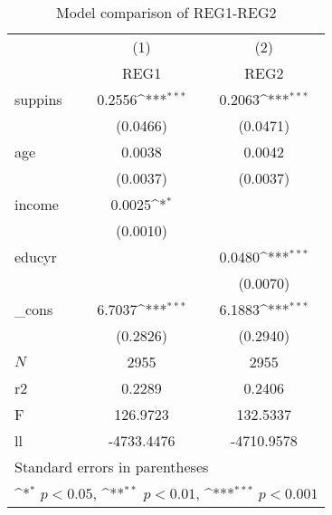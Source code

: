 \begin{table}[htbp]\centering
\def\sym#1{\ifmmode^{#1}\else\(^{#1}\)\fi}
\caption{Model comparison of REG1-REG2}
\begin{tabular}{l*{2}{c}}
\hline\hline
            &\multicolumn{1}{c}{(1)}&\multicolumn{1}{c}{(2)}\\
            &\multicolumn{1}{c}{REG1}&\multicolumn{1}{c}{REG2}\\
\hline
suppins     &      0.2556\sym{***}&      0.2063\sym{***}\\
            &    (0.0466)         &    (0.0471)         \\
[1em]
age         &      0.0038         &      0.0042         \\
            &    (0.0037)         &    (0.0037)         \\
[1em]
income      &      0.0025\sym{*}  &                     \\
            &    (0.0010)         &                     \\
[1em]
educyr      &                     &      0.0480\sym{***}\\
            &                     &    (0.0070)         \\
[1em]
\_cons      &      6.7037\sym{***}&      6.1883\sym{***}\\
            &    (0.2826)         &    (0.2940)         \\
\hline
\(N\)       &        2955         &        2955         \\
r2          &      0.2289         &      0.2406         \\
F           &    126.9723         &    132.5337         \\
ll          &  -4733.4476         &  -4710.9578         \\
\hline\hline
\multicolumn{3}{l}{\footnotesize Standard errors in parentheses}\\
\multicolumn{3}{l}{\footnotesize \sym{*} \(p<0.05\), \sym{**} \(p<0.01\), \sym{***} \(p<0.001\)}\\
\end{tabular}
\end{table}
